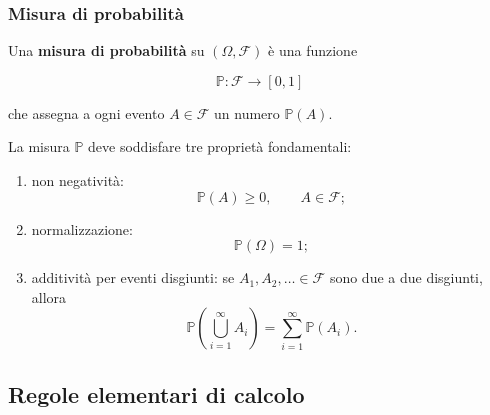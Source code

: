 \documentclass[handout]{beamer}%
\newenvironment{stepenumerate}{\begin{enumerate}[<+->]}{\end{enumerate}}
\providecommand{\Prob}{\mathbb{P}}
\providecommand{\F}{\mathcal{F}}
\providecommand{\1}{\mathbf{1}}
\providecommand{\QTR}[2]{\csname #1\endcsname{#2}}
\begin{document}
\begin{frame}%
%

\frametitle{Misura di probabilit\`{a}}%


Una \textbf{misura di probabilit\`{a}} su $(\Omega,\F)$ \`{e} una funzione%

\[
\Prob:\F\longrightarrow[0,1]
\]


che assegna a ogni evento $A\in\F$ un numero $\Prob(A)$.

\medskip

La misura $\Prob$ deve soddisfare tre propriet\`{a} fondamentali:

\begin{stepenumerate}
\item[1.] non negativit\`{a}:
\[
\Prob(A)\geq0,\qquad A\in\F;
\]


\item[2.] normalizzazione:
\[
\Prob(\Omega)=1;
\]


\item[3.] additivit\`{a} per eventi disgiunti: se $A_{1},A_{2},\ldots\in\F$
sono due a due disgiunti, allora
\[
\Prob\left( \bigcup_{i=1}^{\infty}A_{i}\right)  = \sum_{i=1}^{\infty
}\Prob(A_{i}).
\]

\end{stepenumerate}%

\transboxout
\end{frame}%




\subsection{Regole elementari di calcolo}%
\end{document}
